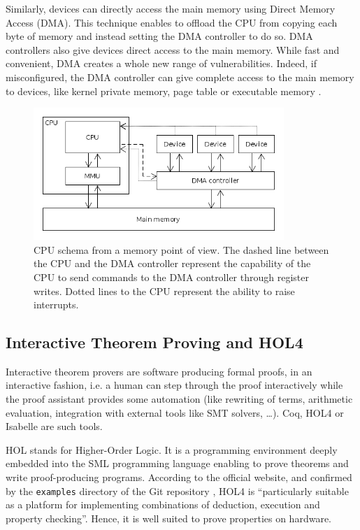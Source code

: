 \documentclass{kththesis}
\begin{document}
Similarly, devices can directly access the main memory using Direct Memory Access (DMA). This technique enables to offload the CPU from copying each byte of memory and instead setting the DMA controller to do so. DMA controllers also give devices direct access to the main memory. While fast and convenient, DMA creates a whole new range of vulnerabilities. Indeed, if misconfigured, the DMA controller can give complete access to the main memory to devices, like kernel private memory, page table or executable memory \cite{schwarz_formal_2014}.

\begin{figure}[!t]
	\includegraphics[height=5cm]{figures/cpu-memory-schema.png}
	\centering
	\caption{
CPU schema from a memory point of view. The dashed line between the CPU and the DMA controller represent the capability of the CPU to send commands to the DMA controller through register writes. Dotted lines to the CPU represent the ability to raise interrupts.
}
	\label{cpu-memory-schema}
\end{figure}

\subsection{Interactive Theorem Proving and HOL4}

Interactive theorem provers are software producing formal proofs, in an
interactive fashion, i.e. a human can step through the proof interactively while the proof assistant provides some automation (like rewriting of terms, arithmetic evaluation, integration with external tools like SMT solvers, \dots). Coq, HOL4 or Isabelle are such tools.

HOL \cite{noauthor_hol_nodate} stands for Higher-Order Logic. It is a programming environment deeply embedded into the SML programming language enabling to prove theorems and write proof-producing programs. According to the official website, and confirmed by the \texttt{examples} directory of the Git repository \cite{noauthor_canonical_2019}, HOL4 is ``particularly suitable as a platform for implementing combinations of deduction, execution and property checking''. Hence, it is well suited to prove properties on hardware.
\end{document}
